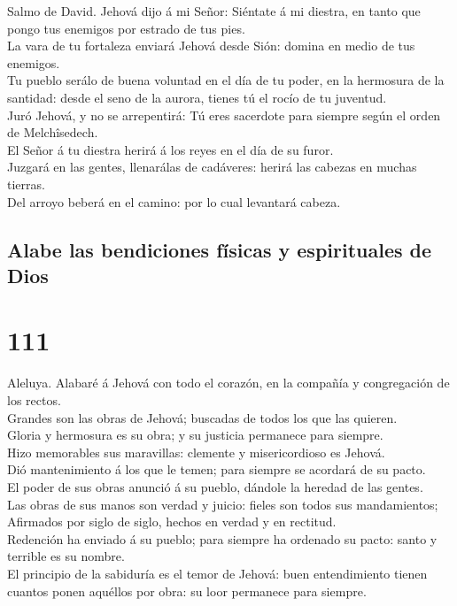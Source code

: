  Salmo de David. Jehová dijo á mi Señor: Siéntate á mi
diestra, en tanto que pongo tus enemigos por estrado de tus pies.\\
 La vara de tu fortaleza enviará Jehová desde Sión: domina
en medio de tus enemigos.\\
 Tu pueblo serálo de buena voluntad en el día de tu poder,
en la hermosura de la santidad: desde el seno de la aurora, tienes tú el
rocío de tu juventud.\\
 Juró Jehová, y no se arrepentirá: Tú eres sacerdote para
siempre según el orden de Melchîsedech.\\
 El Señor á tu diestra herirá á los reyes en el día de su
furor.\\
 Juzgará en las gentes, llenarálas de cadáveres: herirá
las cabezas en muchas tierras.\\
 Del arroyo beberá en el camino: por lo cual levantará
cabeza.

\hypertarget{alabe-las-bendiciones-fuxedsicas-y-espirituales-de-dios}{%
\subsection{Alabe las bendiciones físicas y espirituales de
Dios}\label{alabe-las-bendiciones-fuxedsicas-y-espirituales-de-dios}}

\hypertarget{section-110}{%
\section{111}\label{section-110}}

 Aleluya. Alabaré á Jehová con todo el corazón, en la
compañía y congregación de los rectos.\\
 Grandes son las obras de Jehová; buscadas de todos los
que las quieren.\\
 Gloria y hermosura es su obra; y su justicia permanece
para siempre.\\
 Hizo memorables sus maravillas: clemente y misericordioso
es Jehová.\\
 Dió mantenimiento á los que le temen; para siempre se
acordará de su pacto.\\
 El poder de sus obras anunció á su pueblo, dándole la
heredad de las gentes.\\
 Las obras de sus manos son verdad y juicio: fieles son
todos sus mandamientos;\\
 Afirmados por siglo de siglo, hechos en verdad y en
rectitud.\\
 Redención ha enviado á su pueblo; para siempre ha
ordenado su pacto: santo y terrible es su nombre.\\
 El principio de la sabiduría es el temor de Jehová: buen
entendimiento tienen cuantos ponen aquéllos por obra: su loor permanece
para siempre.

